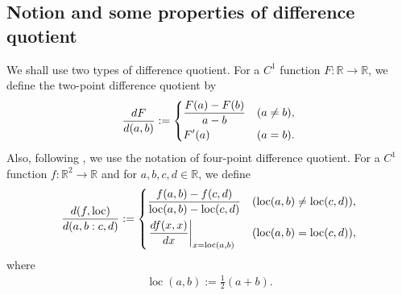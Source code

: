 \documentclass[dvipdfmx-if-dvi,autodetect-engine,ja=standard]{amsart}
\numberwithin{equation}{section} %
\DeclareMathOperator{\loc}{loc}
\begin{document}
\subsection{Notion and some properties of difference quotient}
We shall use two types of
difference quotient.
For a $C^1$ function
$F: \mathbb{R} \to \mathbb{R}$,
we define
the two-point difference quotient
by
\begin{align}
    \frac{dF}{d(a,b)}
    :=
    \begin{dcases}
    \frac{F(a) - F(b)}{a-b}
    &(a\neq b),\\
    F'(a)
    &(a=b).
    \end{dcases}
\end{align}
Also, following \cite{1, 2},
we use the notation of four-point difference quotient.
For a $C^1$ function
$f : \mathbb{R}^2 \to \mathbb{R}$
and for 
$a,b,c,d \in \mathbb{R}$,
we define
\begin{align}
    \frac{d(f,\loc)}{d(a,b:c,d)}
    :=
    \begin{dcases}
    \frac{f(a,b)-f(c,d)}{\loc (a,b)-\loc (c,d)}
    &(\loc (a,b) \neq \loc (c,d)),\\
   \left. \frac{d f(x,x)}{dx} \right|_{x=\loc (a,b)}
   &(\loc (a,b) = \loc (c,d)),
    \end{dcases}
\end{align}
where 
\begin{align}
    \loc (a,b) := \frac{1}{2}(a+b).
\end{align}
\end{document}
